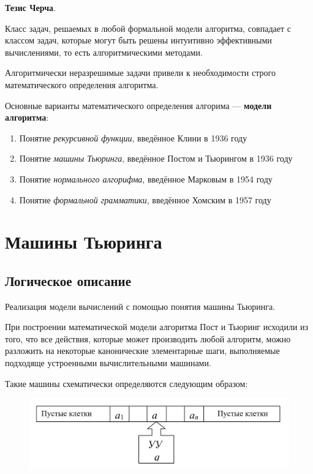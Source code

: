 \textbf{Тезис Черча}.

Класс задач, решаемых в любой формальной модели алгоритма, совпадает с классом задач, которые могут быть решены интуитивно эффективными вычислениями, то есть алгоритмическими методами.

Алгоритмически неразрешимые задачи привели к необходимости строго математического определения алгоритма.

\dftion Основные варианты математического определения алгорима --- \textbf{модели алгоритма}:
\begin{enumerate}
    \item Понятие \textit{рекурсивной функции}, введённое Клини в 1936 году
    \item Понятие \textit{машины Тьюринга}, введённое Постом и Тьюрингом в 1936 году
    \item Понятие \textit{нормального алгорифма}, введённое Марковым в 1954 году
    \item Понятие \textit{формальной грамматики}, введённое Хомским в 1957 году
\end{enumerate}

\section{Машины Тьюринга}
\subsection{Логическое описание}
Реализация модели вычислений с помощью понятия машины Тьюринга.

При построении математической модели алгоритма Пост и Тьюринг исходили из того, что все действия, которые может производить любой алгоритм, можно разложить на некоторые канонические элементарные шаги, выполняемые подходяще устроенными вычислительными машинами.

Такие машины схематически определяются следующим образом:

\begin{figure}[H]
    \centering
    \includegraphics[scale=0.25]{графика/тьюринг.png}
\end{figure}


